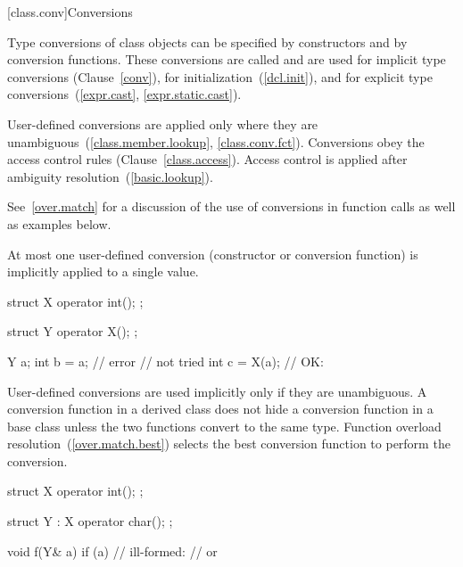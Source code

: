 [class.conv]{Conversions}

\pnum
{}%
%
%
%
%
Type conversions of class objects can be specified by constructors and
by conversion functions.
These conversions are called
and are used for implicit type conversions (Clause~\ref{conv}),
for initialization~(\ref{dcl.init}),
and for explicit type conversions~(\ref{expr.cast}, \ref{expr.static.cast}).

\pnum
User-defined conversions are applied only where they are unambiguous~(\ref{class.member.lookup}, \ref{class.conv.fct}).
Conversions obey the access control rules (Clause~\ref{class.access}).
Access control is applied after ambiguity resolution~(\ref{basic.lookup}).

\pnum
\enternote
See~\ref{over.match} for a discussion of the use of conversions in function calls
as well as examples below.
\exitnote

\pnum
{}%
At most one user-defined conversion (constructor or conversion function)
is implicitly applied to a single value.

\enterexample

\begin{codeblock}
struct X {
  operator int();
};

struct Y {
  operator X();
};

Y a;
int b = a;          // error
                    //  not tried
int c = X(a);       // OK: 
\end{codeblock}
\exitexample

\pnum
User-defined conversions are used implicitly only if they are unambiguous.
%
A conversion function in a derived class does not hide a conversion function
in a base class unless the two functions convert to the same type.
Function overload resolution~(\ref{over.match.best}) selects the best
conversion function to perform the conversion.
\enterexample

\begin{codeblock}
struct X {
  operator int();
};

struct Y : X {
    operator char();
};

void f(Y& a) {
  if (a) {          // ill-formed:
                    //  or 
  }
}
\end{codeblock}
\exitexample

